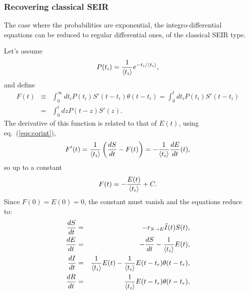 \documentclass[a4paper,oneside,11pt]{article}
\begin{document}
\subsubsection{Recovering classical SEIR}

The case where the probabilities are exponential, the integro-differential equations can be reduced to regular differential ones, of the classical SEIR type.

 Let's assume 
\begin{eqnarray}
P(t_i) = {1\over \langle t_i\rangle} e^{-t_i/\langle t_i\rangle},
\end{eqnarray}
and define
\begin{eqnarray}
F(t) &\equiv& \int_0^\infty dt_iP(t_i) S'(t-t_i) \theta(t-t_i) = \int_0^t dt_i P(t_i)  S'(t-t_i) \nonumber\\
&=& \int_0^t dz P(t-z) S'(z).
\end{eqnarray}
The derivative of this function is related to that of $E(t)$, using eq.~(\ref{eqs:corint}), 
\begin{eqnarray}
F'(t) = {1\over \langle t_i\rangle} \left({d S\over dt}-F(t)\right) = - {1\over \langle t_i\rangle} {dE\over d t}(t), 
\end{eqnarray}
so up to a constant 
\begin{eqnarray}
F(t) = -{E(t)\over \langle t_i\rangle} +C.
\end{eqnarray}
Since $F(0) = E(0) =0$, the constant must vanish and the equations reduce to:
\begin{eqnarray}
{d S\over dt} &=& - r_{S\rightarrow E} \tilde{I}(t) S(t),\nonumber\\ 
{d E\over dt} &=& -{d S\over d t} - {1 \over \langle t_i\rangle} E(t) ,\nonumber\\
{d I\over dt} &=& {1 \over \langle t_i\rangle} E(t) -{1\over \langle t_i\rangle} E(t-t_r) \theta(t-t_r),\nonumber\\
{d R\over d t} &=&  {1\over  \langle t_i\rangle} E(t-t_r) \theta(t-t_r),\nonumber\\
\end{eqnarray}
\end{document}
